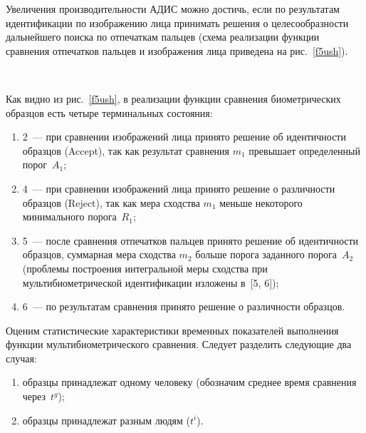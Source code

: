 \begin{multicols}{2}

     Увеличения производительности АДИС можно достичь, если по результатам
идентификации по изображению лица принимать решения о целесообразности
дальнейшего поиска по отпечаткам пальцев (схема реализации функции сравнения
отпечатков пальцев и изображения лица приведена на рис.~\ref{f5ush}).

\begin{figure*} %
\vspace*{1pt}
\begin{center}
\mbox{%
\epsfxsize=146.454mm
}
\end{center}
\vspace*{-9pt}
\end{figure*}

     Как видно из рис.~\ref{f5ush}, в реализации функции сравнения биометрических
образцов есть четыре терминальных состояния:
     \begin{enumerate}[(1)]
\item  2~--- при сравнении изображений лица принято решение об идентичности
образцов (Accept), так как результат сравнения $m_1$ превышает определенный
порог~$A_1$;
\item 4~--- при сравнении изображений лица принято решение о различности
образцов (Reject), так как мера сходства $m_1$ меньше некоторого минимального
порога~$R_1$;
\item 5~--- после сравнения отпечатков пальцев принято решение об идентичности
образцов, суммарная мера сходства $m_2$ больше порога  заданного
порога~$A_2$ (проблемы построения интегральной меры сходства при
мультибиометрической идентификации изложены в~[5, 6]);
\item 6~--- по результатам сравнения принято решение о различности образцов.
\end{enumerate}

     Оценим статистические характеристики временных показателей выполнения
функции мультибиометрического сравнения. Следует разделить следующие два случая:
     \begin{enumerate}[(1)]
\item образцы принадлежат одному человеку (обозначим среднее время сравнения через~$t^g$);
\item образцы принадлежат разным людям ($t^i$).
\end{enumerate}


\end{multicols}
